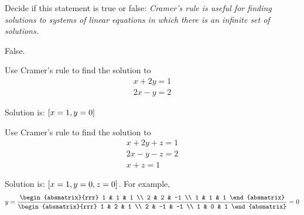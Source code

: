 \begin{enumialphparenastyle}

\begin{ex}Decide if this statement is true or false: \textit{Cramer's rule is useful for finding solutions to systems of linear
equations in which there is an infinite set of solutions.} 
\begin{sol}
False.
\end{sol}
\end{ex}

\begin{ex} Use Cramer's rule to find the solution to 
\begin{equation*}
\begin{array}{c}
x+2y=1 \\
2x-y=2
\end{array}
\end{equation*}
\begin{sol}
Solution is: $\left[x=1,y=0\right] $
\end{sol}
\end{ex}

\begin{ex} Use Cramer's rule to find the solution to 
\begin{equation*}
\begin{array}{c}
x+2y+z=1 \\
2x-y-z=2 \\
x+z=1
\end{array}
\end{equation*}
\begin{sol}
Solution is: $\left[x=1,y=0,z=0\right] $. For example,
\[
y=\frac{\begin{absmatrix}{rrr}
1 & 1 & 1 \\
2 & 2 & -1 \\
1 & 1 & 1
\end{absmatrix}}{\begin{absmatrix}{rrr}
1 & 2 & 1 \\
2 & -1 & -1 \\
1 & 0 & 1
\end{absmatrix}}=0
\]
\end{sol}
\end{ex}

\end{enumialphparenastyle}